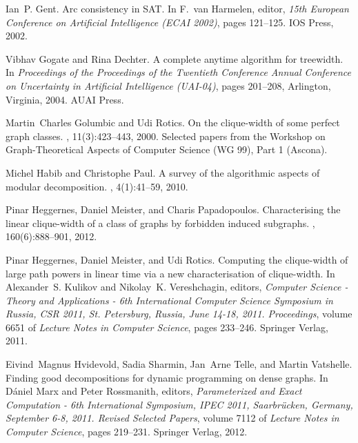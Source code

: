 \documentclass[10pt,usletter]{article}
\theoremstyle{remark}
\begin{document}
\begin{thebibliography}{10}
Ian~P. Gent.
\newblock Arc consistency in {SAT}.
\newblock In F.~{van Harmelen}, editor, {\em 15th European Conference on
  Artificial Intelligence (ECAI 2002)}, pages 121--125. IOS Press, 2002.

Vibhav Gogate and Rina Dechter.
\newblock A complete anytime algorithm for treewidth.
\newblock In {\em Proceedings of the Proceedings of the Twentieth Conference
  Annual Conference on Uncertainty in Artificial Intelligence (UAI-04)}, pages
  201--208, Arlington, Virginia, 2004. AUAI Press.

Martin~Charles Golumbic and Udi Rotics.
\newblock On the clique-width of some perfect graph classes.
, 11(3):423--443, 2000.
\newblock Selected papers from the Workshop on Graph-Theoretical Aspects of
  Computer Science (WG 99), Part 1 (Ascona).

Michel Habib and Christophe Paul.
\newblock A survey of the algorithmic aspects of modular decomposition.
, 4(1):41--59, 2010.

Pinar Heggernes, Daniel Meister, and Charis Papadopoulos.
\newblock Characterising the linear clique-width of a class of graphs by
  forbidden induced subgraphs.
, 160(6):888--901, 2012.

Pinar Heggernes, Daniel Meister, and Udi Rotics.
\newblock Computing the clique-width of large path powers in linear time via a
  new characterisation of clique-width.
\newblock In Alexander~S. Kulikov and Nikolay~K. Vereshchagin, editors, {\em
  Computer Science - Theory and Applications - 6th International Computer
  Science Symposium in Russia, CSR 2011, St. Petersburg, Russia, June 14-18,
  2011. Proceedings}, volume 6651 of {\em Lecture Notes in Computer Science},
  pages 233--246. Springer Verlag, 2011.

Eivind~Magnus Hvidevold, Sadia Sharmin, Jan~Arne Telle, and Martin Vatshelle.
\newblock Finding good decompositions for dynamic programming on dense graphs.
\newblock In D{\'a}niel Marx and Peter Rossmanith, editors, {\em Parameterized
  and Exact Computation - 6th International Symposium, IPEC 2011,
  Saarbr{\"u}cken, Germany, September 6-8, 2011. Revised Selected Papers},
  volume 7112 of {\em Lecture Notes in Computer Science}, pages 219--231.
  Springer Verlag, 2012.


\end{thebibliography}
\end{document}
